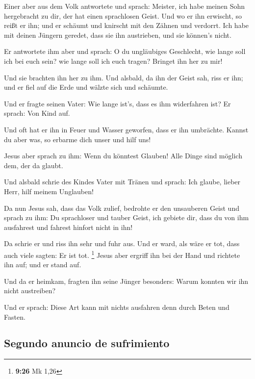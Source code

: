  Einer aber aus dem Volk antwortete und sprach: Meister,
ich habe meinen Sohn hergebracht zu dir, der hat einen sprachlosen
Geist.  Und wo er ihn erwischt, so reißt er ihn; und er
schäumt und knirscht mit den Zähnen und verdorrt. Ich habe mit deinen
Jüngern geredet, dass sie ihn austrieben, und sie können's nicht.

 Er antwortete ihm aber und sprach: O du ungläubiges
Geschlecht, wie lange soll ich bei euch sein? wie lange soll ich euch
tragen? Bringet ihn her zu mir!

 Und sie brachten ihn her zu ihm. Und alsbald, da ihn der
Geist sah, riss er ihn; und er fiel auf die Erde und wälzte sich und
schäumte.

 Und er fragte seinen Vater: Wie lange ist's, dass es ihm
widerfahren ist? Er sprach: Von Kind auf.

 Und oft hat er ihn in Feuer und Wasser geworfen, dass er
ihn umbrächte. Kannst du aber was, so erbarme dich unser und hilf uns!

 Jesus aber sprach zu ihm: Wenn du könntest Glauben! Alle
Dinge sind möglich dem, der da glaubt.

 Und alsbald schrie des Kindes Vater mit Tränen und
sprach: Ich glaube, lieber Herr, hilf meinem Unglauben!

 Da nun Jesus sah, dass das Volk zulief, bedrohte er den
unsauberen Geist und sprach zu ihm: Du sprachloser und tauber Geist, ich
gebiete dir, dass du von ihm ausfahrest und fahrest hinfort nicht in
ihn!

 Da schrie er und riss ihn sehr und fuhr aus. Und er
ward, als wäre er tot, dass auch viele sagten: Er ist tot. \footnote{\textbf{9:26}
  Mk 1,26}  Jesus aber ergriff ihn bei der Hand und
richtete ihn auf; und er stand auf.

 Und da er heimkam, fragten ihn seine Jünger besonders:
Warum konnten wir ihn nicht austreiben?

 Und er sprach: Diese Art kann mit nichts ausfahren denn
durch Beten und Fasten.

\hypertarget{segundo-anuncio-de-sufrimiento}{%
\subsection{Segundo anuncio de
sufrimiento}\label{segundo-anuncio-de-sufrimiento}}

